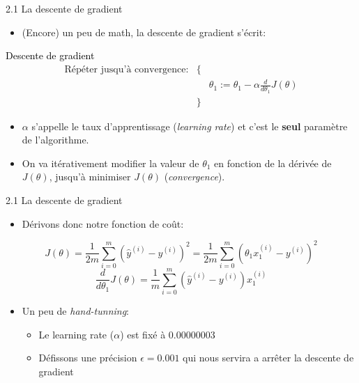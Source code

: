 \begin{frame}{2.1 La descente de gradient}
  \begin{itemize}
  \item (Encore) un peu de math, la descente de gradient s'écrit:
  \end{itemize}
  \begin{beamerboxesrounded}[scheme=suppervise,width=\textwidth]{\textcolor{black}{Descente de gradient}}    
    \vspace{-0.2cm}
    \begin{equation*}
      \begin{matrix} \text{Répéter jusqu'à convergence:} & \{ & \\ & & \theta_{1} := \theta_{1} - \alpha \frac{d}{d\theta_{1}}J(\theta) \\ & \} & \end{matrix}
    \end{equation*}
    \vspace{-0.2cm}
  \end{beamerboxesrounded}
  \begin{itemize}
  \item $\alpha$ s'appelle le taux d'apprentissage (\textit{learning rate}) et c'est le \textbf{seul} paramètre de l'algorithme.
    \vspace{0.2cm}
  \item On va itérativement modifier la valeur de $\theta_{1}$ en fonction de la dérivée de $J(\theta)$, jusqu'à minimiser $J(\theta)$ (\textit{convergence}).
  \end{itemize}
\end{frame}

\begin{frame}{2.1 La descente de gradient}
  \begin{itemize}
  \item Dérivons donc notre fonction de coût:
  \end{itemize}
  \begin{equation*}
    J(\theta) = \frac{1}{2m} \displaystyle\sum_{i=0}^{m}(\hat{y}^{(i)} - y^{(i)})^{2} = \frac{1}{2m} \displaystyle\sum_{i=0}^{m}(\theta_{1}x_{1}^{(i)} - y^{(i)})^{2}
  \end{equation*}
  \begin{equation*}
    \frac{d}{d\theta_{1}}J(\theta) = \frac{1}{m}\displaystyle\sum_{i=0}^{m}(\hat{y}^{(i)} - y^{(i)}) x_{1}^{(i)}
  \end{equation*}
  \begin{itemize}
  \item Un peu de \textit{hand-tunning}:
    \begin{itemize}
    \item Le learning rate ($\alpha$) est fixé à $0.00000003$
    \item Défissons une précision $\epsilon = 0.001$ qui nous servira a arrêter la descente de gradient 
    \end{itemize}
  \end{itemize}
\end{frame}

